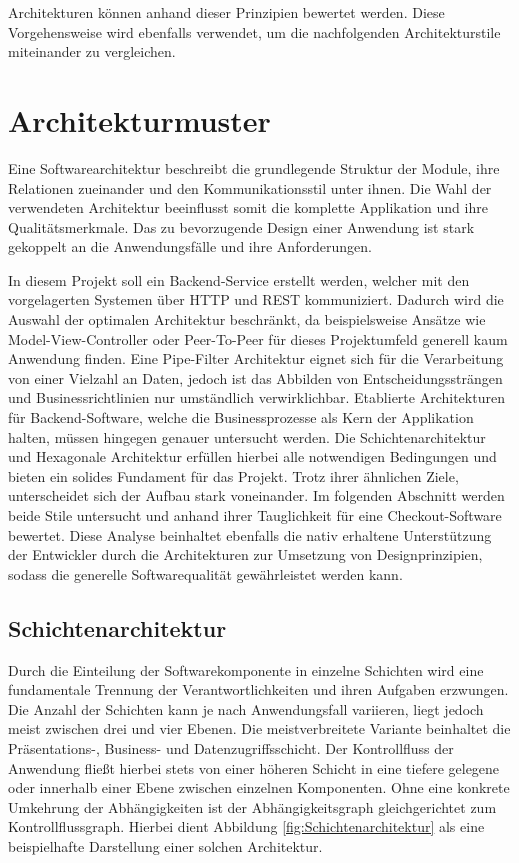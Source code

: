 Architekturen können anhand dieser Prinzipien bewertet werden. Diese Vorgehensweise wird ebenfalls verwendet, um die nachfolgenden Architekturstile miteinander zu vergleichen. 

\section{Architekturmuster}

Eine Softwarearchitektur beschreibt die grundlegende Struktur der Module, ihre Relationen zueinander und den Kommunikationsstil unter ihnen. Die Wahl der verwendeten Architektur beeinflusst somit die komplette Applikation und ihre Qualitätsmerkmale. Das zu bevorzugende Design einer Anwendung ist stark gekoppelt an die Anwendungsfälle und ihre Anforderungen. 

In diesem Projekt soll ein Backend-Service erstellt werden, welcher mit den vorgelagerten Systemen über \acrshort{HTTP} und \acrshort{REST} kommuniziert. Dadurch wird die Auswahl der optimalen Architektur beschränkt, da beispielsweise Ansätze wie Model-View-Controller oder Peer-To-Peer für dieses Projektumfeld generell kaum Anwendung finden. Eine Pipe-Filter Architektur eignet sich für die Verarbeitung von einer Vielzahl an Daten, jedoch ist das Abbilden von Entscheidungssträngen und Businessrichtlinien nur umständlich verwirklichbar. Etablierte Architekturen für Backend-Software, welche die Businessprozesse als Kern der Applikation halten, müssen hingegen genauer untersucht werden. Die Schichtenarchitektur und Hexagonale Architektur erfüllen hierbei alle notwendigen Bedingungen und bieten ein solides Fundament für das Projekt. Trotz ihrer ähnlichen Ziele, unterscheidet sich der Aufbau  stark voneinander. Im folgenden Abschnitt werden beide Stile untersucht und anhand ihrer Tauglichkeit für eine Checkout-Software bewertet. Diese Analyse beinhaltet ebenfalls die nativ erhaltene Unterstützung der Entwickler durch die Architekturen zur Umsetzung von Designprinzipien, sodass die generelle Softwarequalität gewährleistet werden kann. 

\subsection{Schichtenarchitektur}

Durch die Einteilung der Softwarekomponente in einzelne Schichten wird eine fundamentale Trennung der Verantwortlichkeiten und ihren Aufgaben erzwungen. Die Anzahl der Schichten kann je nach Anwendungsfall variieren, liegt jedoch meist zwischen drei und vier Ebenen. Die meistverbreitete Variante beinhaltet die Präsentations-, Business- und Datenzugriffsschicht. Der Kontrollfluss der Anwendung fließt hierbei stets von einer höheren Schicht in eine tiefere gelegene oder innerhalb einer Ebene zwischen einzelnen Komponenten. Ohne eine konkrete Umkehrung der Abhängigkeiten ist der Abhängigkeitsgraph gleichgerichtet zum Kontrollflussgraph. Hierbei dient Abbildung \ref{fig:Schichtenarchitektur} als eine beispielhafte Darstellung einer solchen Architektur. 

